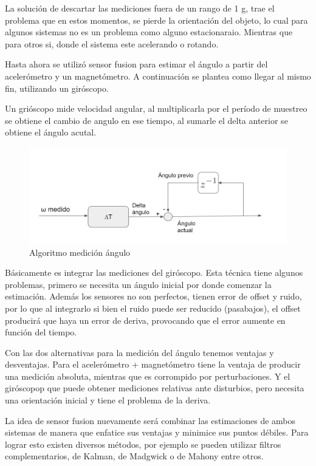 La solución de descartar las mediciones fuera de un rango de 1 g, trae el problema que en estos momentos, se pierde la orientación del objeto, lo cual para algunos sistemas no es un problema como alguno estacionaraio. Mientras que para otros si, donde el sistema este acelerando o rotando.


Hasta ahora se utilizó sensor fusion para estimar el ángulo a partir del aceler\'ometro y un magnet\'ometro. A continuaci\'on se plantea como llegar al mismo fin, utilizando un gir\'oscopo.



Un gri\'oscopo mide velocidad angular, al multiplicarla por el per\'iodo de muestreo se obtiene el cambio de angulo en ese tiempo, al sumarle el delta anterior se obtiene el \'angulo acutal.

 \begin{figure}[H]
	\center
	\includegraphics[width=0.8\linewidth, page=1,]{Imagenes/giroscmeas
}
	\caption{Algoritmo medici\'on ángulo}
	\label{fig:Esq_con:ang}
\end{figure}

Básicamente es integrar las mediciones del giróscopo.
Esta técnica tiene algunos problemas, primero se necesita un ángulo inicial por donde comenzar la estimación. Además los sensores no son perfectos, tienen error de offset y ruido, por lo que al integrarlo si bien el ruido puede ser reducido (pasabajos), el offset producirá que haya un error de deriva, provocando que el error aumente en función del tiempo.


Con las dos alternativas para la medición del ángulo tenemos ventajas y desventajas.
Para el acelerómetro + magnet\'ometro tiene la ventaja de producir una medici\'on absoluta, mientras que es corrompido por perturbaciones. Y el gir\'oscopop que puede obtener mediciones relativas ante disturbios, pero necesita una orientaci\'on inicial y tiene el problema de la deriva.


La idea de sensor fusion nuevamente ser\'a combinar las estimaciones de ambos sistemas de manera que enfatice sus ventajas y minimice sus puntos débiles. 
Para lograr esto existen diversos m\'etodos, por ejemplo se pueden utilizar filtros complementarios, de Kalman, de Madgwick o de Mahony entre otros.


